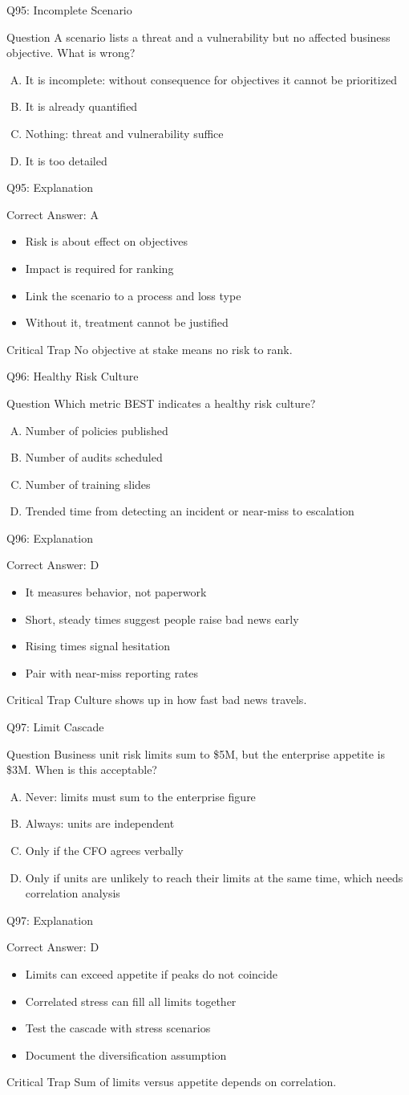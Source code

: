 \documentclass[aspectratio=169]{beamer}
\newcommand{\hq}[7]{%
  \begin{frame}{Q#1: #2}
    \begin{block}{Question}
      #3
    \end{block}
    \begin{enumerate}[(A)]
      #4
    \end{enumerate}
  \end{frame}
  \begin{frame}{Q#1: Explanation}
    \begin{block}{Correct Answer: #5}
      \begin{itemize}
        #6
      \end{itemize}
    \end{block}
    \begin{alertblock}{Critical Trap}
      #7
    \end{alertblock}
  \end{frame}
}
\begin{document}
\hq{95}{Incomplete Scenario}
{A scenario lists a threat and a vulnerability but no affected business objective. What is wrong?}
{\item It is incomplete: without consequence for objectives it cannot be prioritized
 \item It is already quantified
 \item Nothing: threat and vulnerability suffice
 \item It is too detailed}
{A}
{\item Risk is about effect on objectives
 \item Impact is required for ranking
 \item Link the scenario to a process and loss type
 \item Without it, treatment cannot be justified}
{No objective at stake means no risk to rank.}

\hq{96}{Healthy Risk Culture}
{Which metric BEST indicates a healthy risk culture?}
{\item Number of policies published
 \item Number of audits scheduled
 \item Number of training slides
 \item Trended time from detecting an incident or near-miss to escalation}
{D}
{\item It measures behavior, not paperwork
 \item Short, steady times suggest people raise bad news early
 \item Rising times signal hesitation
 \item Pair with near-miss reporting rates}
{Culture shows up in how fast bad news travels.}

\hq{97}{Limit Cascade}
{Business unit risk limits sum to \$5M, but the enterprise appetite is \$3M. When is this acceptable?}
{\item Never: limits must sum to the enterprise figure
 \item Always: units are independent
 \item Only if the CFO agrees verbally
 \item Only if units are unlikely to reach their limits at the same time, which needs correlation analysis}
{D}
{\item Limits can exceed appetite if peaks do not coincide
 \item Correlated stress can fill all limits together
 \item Test the cascade with stress scenarios
 \item Document the diversification assumption}
{Sum of limits versus appetite depends on correlation.}
\end{document}
